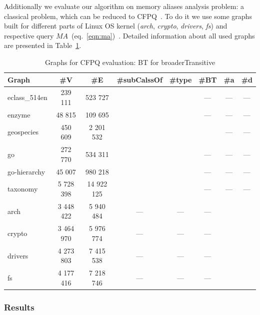 Additionally we evaluate our algorithm on memory aliases analysis problem: a classical problem, which can be reduced to CFPQ~\cite{Zheng:2008:DAA:1328897.1328464}.
To do it we use some graphs built for different parts of Linux OS kernel (\textit{arch}, \textit{crypto}, \textit{drivers}, \textit{fs}) and respective query $MA$~(eq.~\ref{eqn:ma})~\cite{10.1145/3093336.3037744}.
Detailed information about all used graphs are presented in Table~\ref{tbl:graphs_for_cfpq}.  

{\setlength{\tabcolsep}{0.2em}
\begin{table}
{
\caption{Graphs for CFPQ evaluation: BT for broaderTransitive}
\label{tbl:graphs_for_cfpq}
\small
{}
\begin{tabular}{|l|c|c|c|c|c|c|c|}
\hline
Graph          & \#V       & \#E        & \#subCalssOf & \#type &\tiny{\#BT} & \#a  & \#d \\
\hline
\hline 
eclass\_514en  & 239 111    & 523 727    &              &        &        ---        & ---  & --- \\
enzyme         & 48 815     & 109 695    &              &        &        ---        & ---  & --- \\
geospecies     & 450 609    & 2 201 532  &              &        &                   & ---  & --- \\
go             & 272 770    & 534 311    &              &        &        ---        & ---  & --- \\
go-hierarchy   & 45 007     & 980 218    &              &        &        ---        & ---  & --- \\
taxonomy       & 5 728 398  & 14 922 125 &              &        &        ---        & ---  & --- \\
\hline
arch           & 3 448 422  & 5 940 484  &      ---     &  ---   &        ---        &      &     \\
crypto         & 3 464 970  & 5 976 774  &      ---     &  ---   &        ---        &      &     \\
drivers        & 4 273 803  & 7 415 538  &      ---     &  ---   &        ---        &      &     \\
fs             & 4 177 416  & 7 218 746  &      ---     &  ---   &        ---        &      &     \\
\hline
\end{tabular}
}
\end{table}
}
\subsubsection{Results}

